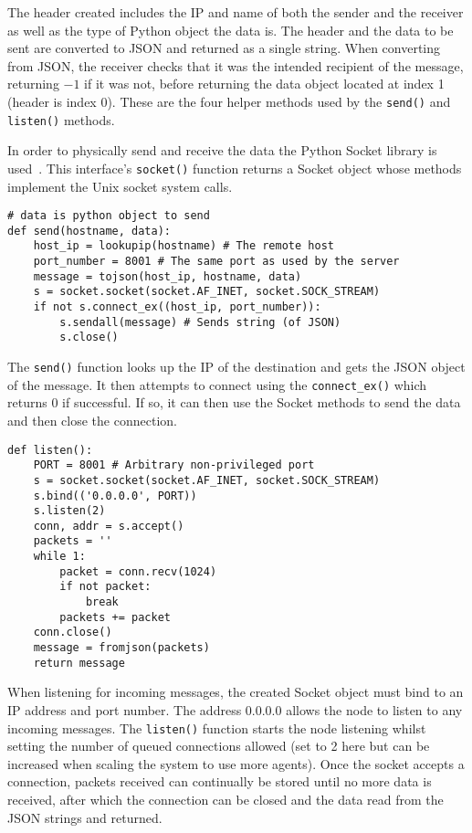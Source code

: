 The header created includes the IP and name of both the sender and the
receiver as well as the type of Python object the data is. The header 
and the data to be sent are converted to JSON and returned as a single
string. When  converting from JSON, the receiver checks that it was the
intended recipient of the message, returning $-1$ if it was not, before
returning the data object located at index 1 (header is index 0). These
are the four helper methods used by the \verb|send()| and \verb|listen()|
methods.

In order to physically send and receive the data the Python Socket library
is used~\cite{socketServerDocs}. This interface's \verb|socket()| function 
returns a Socket object whose methods implement the Unix socket system calls.

\begin{lstlisting}
# data is python object to send
def send(hostname, data):
    host_ip = lookupip(hostname) # The remote host
    port_number = 8001 # The same port as used by the server
    message = tojson(host_ip, hostname, data)
    s = socket.socket(socket.AF_INET, socket.SOCK_STREAM)
    if not s.connect_ex((host_ip, port_number)):
        s.sendall(message) # Sends string (of JSON)
        s.close()
\end{lstlisting}

The \verb|send()| function looks up the IP of the destination and gets the JSON
object of the message. It then attempts to connect using the \verb|connect_ex()|
which returns 0 if successful. If so, it can then use the Socket methods to send
the data and then close the connection.

\begin{lstlisting}
def listen():
    PORT = 8001 # Arbitrary non-privileged port
    s = socket.socket(socket.AF_INET, socket.SOCK_STREAM)
    s.bind(('0.0.0.0', PORT))
    s.listen(2)
    conn, addr = s.accept()
    packets = ''
    while 1:
        packet = conn.recv(1024)
        if not packet:
            break
        packets += packet
    conn.close()
    message = fromjson(packets)
    return message
\end{lstlisting}

When listening for incoming messages, the created Socket object must bind to
an IP address and port number. The address 0.0.0.0 allows the node to listen
to any incoming messages. The \verb|listen()| function starts the node listening
whilst setting the number of queued connections allowed (set to 2 here but can
be increased when scaling the system to use more agents). Once the socket
accepts a connection, packets received can continually be stored
until no more data is received, after which the connection can be closed and
the data read from the JSON strings and returned.


